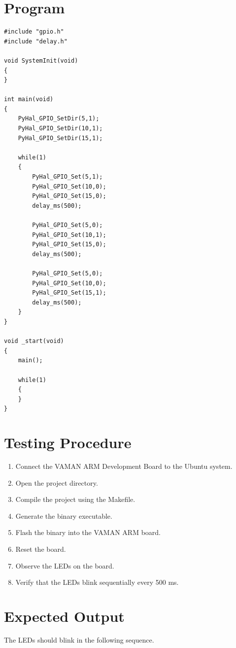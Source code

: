 \documentclass[12pt]{article}
\begin{document}
\section{Program}

\begin{lstlisting}
#include "gpio.h"
#include "delay.h"

void SystemInit(void)
{
}

int main(void)
{
    PyHal_GPIO_SetDir(5,1);
    PyHal_GPIO_SetDir(10,1);
    PyHal_GPIO_SetDir(15,1);

    while(1)
    {
        PyHal_GPIO_Set(5,1);
        PyHal_GPIO_Set(10,0);
        PyHal_GPIO_Set(15,0);
        delay_ms(500);

        PyHal_GPIO_Set(5,0);
        PyHal_GPIO_Set(10,1);
        PyHal_GPIO_Set(15,0);
        delay_ms(500);

        PyHal_GPIO_Set(5,0);
        PyHal_GPIO_Set(10,0);
        PyHal_GPIO_Set(15,1);
        delay_ms(500);
    }
}

void _start(void)
{
    main();

    while(1)
    {
    }
}
\end{lstlisting}

\section{Testing Procedure}

\begin{enumerate}
\item Connect the VAMAN ARM Development Board to the Ubuntu system.
\item Open the project directory.
\item Compile the project using the Makefile.
\item Generate the binary executable.
\item Flash the binary into the VAMAN ARM board.
\item Reset the board.
\item Observe the LEDs on the board.
\item Verify that the LEDs blink sequentially every 500 ms.
\end{enumerate}


\section{Expected Output}

The LEDs should blink in the following sequence.
\end{document}
